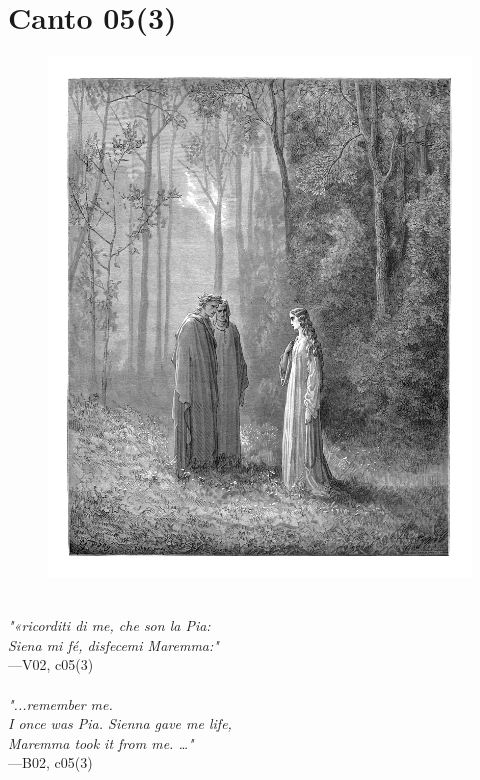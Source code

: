 \documentclass[../Dore_vision.tex]{subfiles}
\begin{document}
\newpage

\section{Canto 05(3)}

\begin{figure}[ht]
\centering
\includegraphics[height=\figsize]{illustrations/book_2/V02, c05(3).jpg}
\end{figure}

\begin{center}
\begin{minipage}{0.8\linewidth}
\textit{\\
"«ricorditi di me, che son la Pia:\\Siena mi fé, disfecemi Maremma:"} \\
—V02, c05(3) \\~\\
\textit{"...remember me.\\I once was Pia. Sienna gave me life,\\Maremma took it from me. …"} \\
—B02, c05(3)
\end{minipage}
\end{center}
\end{document}
